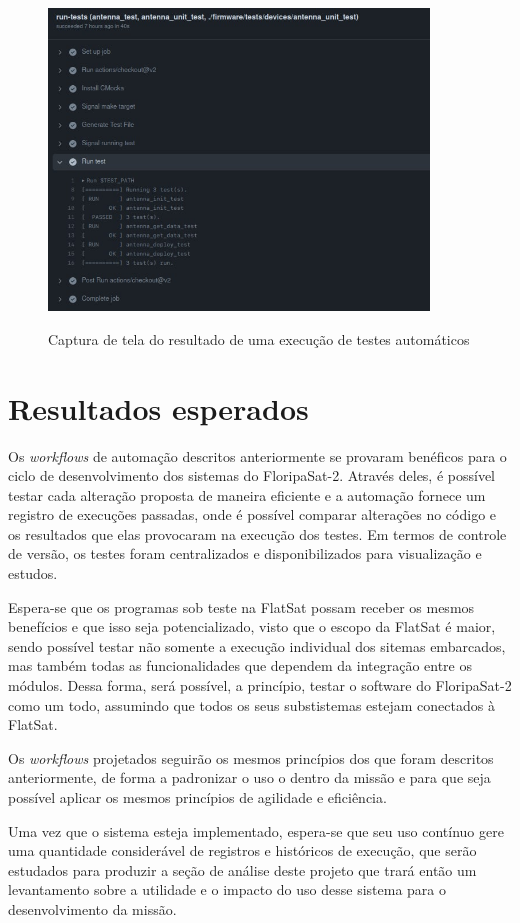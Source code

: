     \begin{figure}[h!]
        \centering
        \caption{Captura de tela do resultado de uma execução de testes automáticos}
        \includegraphics[width=0.9\textwidth]{images/workflow_log.jpg}
        \label{fig:workflow_log}
    \end{figure}

\section{Resultados esperados}
Os \textit{workflows} de automação descritos anteriormente se provaram benéficos para o ciclo de desenvolvimento dos sistemas do FloripaSat-2. Através deles, é possível testar cada alteração proposta de maneira eficiente e a automação fornece um registro de execuções passadas, onde é possível comparar alterações no código e os resultados que elas provocaram na execução dos testes. Em termos de controle de versão, os testes foram centralizados e disponibilizados para visualização e estudos.

Espera-se que os programas sob teste na FlatSat possam receber os mesmos benefícios e que isso seja potencializado, visto que o escopo da FlatSat é maior, sendo possível testar não somente a execução individual dos sitemas embarcados, mas também todas as funcionalidades que dependem da integração entre os módulos. Dessa forma, será possível, a princípio, testar o software do FloripaSat-2 como um todo, assumindo que todos os seus substistemas estejam conectados à FlatSat.

Os \textit{workflows} projetados seguirão os mesmos princípios dos que foram descritos anteriormente, de forma a padronizar o uso o dentro da missão e para que seja possível aplicar os mesmos princípios de agilidade e eficiência.

Uma vez que o sistema esteja implementado, espera-se que seu uso contínuo gere uma quantidade considerável de registros e históricos de execução, que serão estudados para produzir a seção de análise deste projeto que trará então um levantamento sobre a utilidade e o impacto do uso desse sistema para o desenvolvimento da missão.
